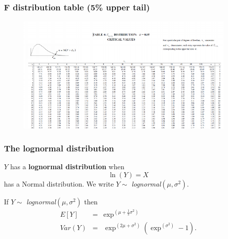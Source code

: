 \documentclass[notes=show,smaller,handout]{beamer}
\begin{document}
\begin{frame}
\frametitle{F distribution table (5\% upper tail)}


\begin{figure}[ptb]\centering
\includegraphics[height=2.2753in, width=4.2263in]{Fdist_table__7.pdf}%
\end{figure}%

\end{frame}%




\begin{frame}%

\frametitle{The lognormal distribution}

\begin{definition}
 $Y$ has a \textbf{lognormal distribution} when 
 $$\ln \left( Y\right) =X$$
has a Normal distribution. We write $Y\sim $ \emph{lognormal}$\left( \mu ,\sigma ^{2}\right) $. 
\end{definition}

\vspace{0.4cm}

If $Y\sim $ \emph{lognormal}$\left( \mu ,\sigma ^{2}\right) $ then%
\begin{eqnarray*}
E\left[ Y\right] &=&\exp^{ \left( \mu +\frac{1}{2}\sigma ^{2}\right)} \\
Var(Y) &=&\exp^{ \left( 2\mu +\sigma ^{2}\right)} \left( \exp^{ \left( \sigma
^{2}\right)} -1\right).
\end{eqnarray*}


\end{frame}%
\end{document}

